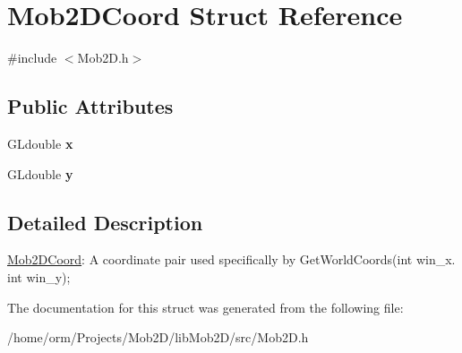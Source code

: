 \hypertarget{structMob2DCoord}{
\section{Mob2DCoord Struct Reference}
\label{structMob2DCoord}
}


{\ttfamily \#include $<$Mob2D.h$>$}\subsection*{Public Attributes}
\begin{DoxyCompactItemize}
\item 
\hypertarget{structMob2DCoord_a7c7b9296f0bd6cdebfcdc4e0364048c3}{
GLdouble {\bfseries x}}
\label{structMob2DCoord_a7c7b9296f0bd6cdebfcdc4e0364048c3}

\item 
\hypertarget{structMob2DCoord_a945e5ded5eb23816b5ef4376b0b7d48f}{
GLdouble {\bfseries y}}
\label{structMob2DCoord_a945e5ded5eb23816b5ef4376b0b7d48f}

\end{DoxyCompactItemize}


\subsection{Detailed Description}
\hyperlink{structMob2DCoord}{Mob2DCoord}: A coordinate pair used specifically by GetWorldCoords(int win\_\-x. int win\_\-y); 

The documentation for this struct was generated from the following file:\begin{DoxyCompactItemize}
\item 
/home/orm/Projects/Mob2D/libMob2D/src/Mob2D.h\end{DoxyCompactItemize}
